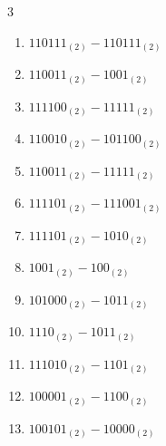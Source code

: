 \begin{multicols}{3}
\begin{enumerate}

  \item $110111_{(2)} - 110111_{(2)}$


  \item $110011_{(2)} - 1001_{(2)}$


  \item $111100_{(2)} - 11111_{(2)}$


\columnbreak %

  \item $110010_{(2)} - 101100_{(2)}$


  \item $110011_{(2)} - 11111_{(2)}$


  \item $111101_{(2)} - 111001_{(2)}$


  \item $111101_{(2)} - 1010_{(2)}$


  \item $1001_{(2)} - 100_{(2)}$


  \item $101000_{(2)} - 1011_{(2)}$


  \item $1110_{(2)} - 1011_{(2)}$


  \item $111010_{(2)} - 1101_{(2)}$


  \item $100001_{(2)} - 1100_{(2)}$


  \item $100101_{(2)} - 10000_{(2)}$



\end{enumerate}
\end{multicols}

